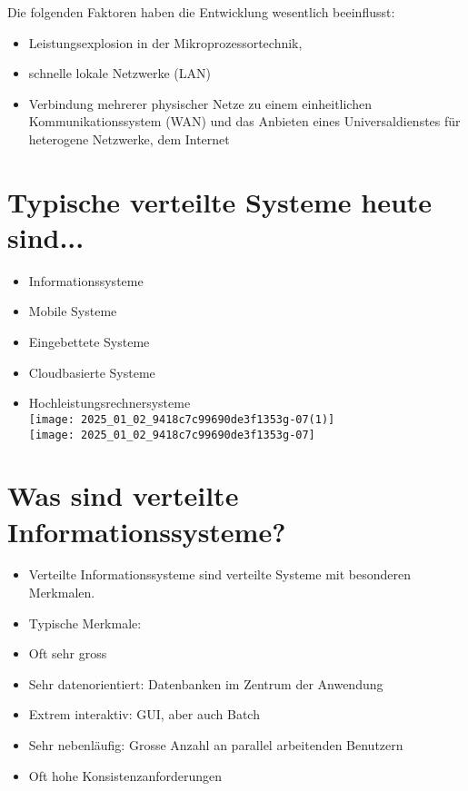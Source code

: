 \documentclass[10pt]{article}
\begin{document}
Die folgenden Faktoren haben die Entwicklung wesentlich beeinflusst:

\begin{itemize}
  \item Leistungsexplosion in der Mikroprozessortechnik,
  \item schnelle lokale Netzwerke (LAN)
  \item Verbindung mehrerer physischer Netze zu einem einheitlichen Kommunikationssystem (WAN) und das Anbieten eines Universaldienstes für heterogene Netzwerke, dem Internet
\end{itemize}

\section*{Typische verteilte Systeme heute sind...}
\begin{itemize}
  \item Informationssysteme
  \item Mobile Systeme
  \item Eingebettete Systeme
  \item Cloudbasierte Systeme
  \item Hochleistungsrechnersysteme\\
\texttt{[image: 2025\_01\_02\_9418c7c99690de3f1353g-07(1)]}\\
\texttt{[image: 2025\_01\_02\_9418c7c99690de3f1353g-07]}
\end{itemize}

\section*{Was sind verteilte Informationssysteme?}
\begin{itemize}
  \item Verteilte Informationssysteme sind verteilte Systeme mit besonderen Merkmalen.
  \item Typische Merkmale:
  \item Oft sehr gross
  \item Sehr datenorientiert: Datenbanken im Zentrum der Anwendung
  \item Extrem interaktiv: GUI, aber auch Batch
  \item Sehr nebenläufig: Grosse Anzahl an parallel arbeitenden Benutzern
  \item Oft hohe Konsistenzanforderungen
\end{itemize}
\end{document}
